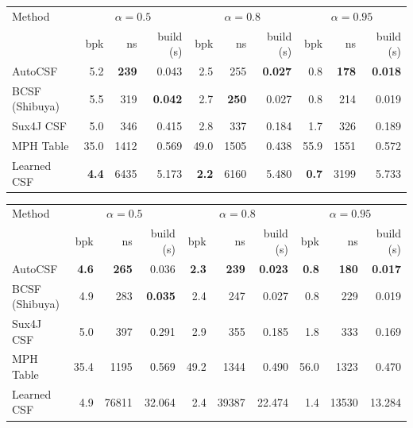 
\begin{tabular}{lrrrrrrrrr}
\toprule
Method & \multicolumn{3}{c}{$\alpha\!=\!0.5$} & \multicolumn{3}{c}{$\alpha\!=\!0.8$} & \multicolumn{3}{c}{$\alpha\!=\!0.95$} \\
 & bpk & ns & build (s) & bpk & ns & build (s) & bpk & ns & build (s) \\
\midrule
AutoCSF & 5.2 & \textbf{239} & 0.043 & 2.5 & 255 & \textbf{0.027} & 0.8 & \textbf{178} & \textbf{0.018} \\
BCSF (Shibuya) & 5.5 & 319 & \textbf{0.042} & 2.7 & \textbf{250} & 0.027 & 0.8 & 214 & 0.019 \\
Sux4J CSF & 5.0 & 346 & 0.415 & 2.8 & 337 & 0.184 & 1.7 & 326 & 0.189 \\
MPH Table & 35.0 & 1412 & 0.569 & 49.0 & 1505 & 0.438 & 55.9 & 1551 & 0.572 \\
Learned CSF & \textbf{4.4} & 6435 & 5.173 & \textbf{2.2} & 6160 & 5.480 & \textbf{0.7} & 3199 & 5.733 \\
\bottomrule
\end{tabular}

\begin{tabular}{lrrrrrrrrr}
\toprule
Method & \multicolumn{3}{c}{$\alpha\!=\!0.5$} & \multicolumn{3}{c}{$\alpha\!=\!0.8$} & \multicolumn{3}{c}{$\alpha\!=\!0.95$} \\
 & bpk & ns & build (s) & bpk & ns & build (s) & bpk & ns & build (s) \\
\midrule
AutoCSF & \textbf{4.6} & \textbf{265} & 0.036 & \textbf{2.3} & \textbf{239} & \textbf{0.023} & \textbf{0.8} & \textbf{180} & \textbf{0.017} \\
BCSF (Shibuya) & 4.9 & 283 & \textbf{0.035} & 2.4 & 247 & 0.027 & 0.8 & 229 & 0.019 \\
Sux4J CSF & 5.0 & 397 & 0.291 & 2.9 & 355 & 0.185 & 1.8 & 333 & 0.169 \\
MPH Table & 35.4 & 1195 & 0.569 & 49.2 & 1344 & 0.490 & 56.0 & 1323 & 0.470 \\
Learned CSF & 4.9 & 76811 & 32.064 & 2.4 & 39387 & 22.474 & 1.4 & 13530 & 13.284 \\
\bottomrule
\end{tabular}

